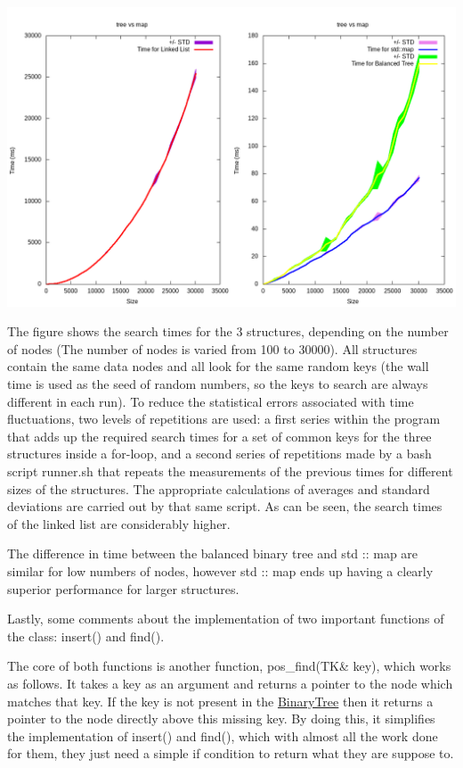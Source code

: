  
\begin{DoxyImage}
\includegraphics[width=\textwidth,height=\textheight/2,keepaspectratio=true]{benchmark.png}
\end{DoxyImage}
  

The figure shows the search times for the 3 structures, depending on the number of nodes (The number of nodes is varied from 100 to 30000). All structures contain the same data nodes and all look for the same random keys (the wall time is used as the seed of random numbers, so the keys to search are always different in each run). To reduce the statistical errors associated with time fluctuations, two levels of repetitions are used\+: a first series within the program that adds up the required search times for a set of common keys for the three structures inside a for-\/loop, and a second series of repetitions made by a bash script {\ttfamily runner.\+sh} that repeats the measurements of the previous times for different sizes of the structures. The appropriate calculations of averages and standard deviations are carried out by that same script. As can be seen, the search times of the linked list are considerably higher.

The difference in time between the balanced binary tree and std \+:: map are similar for low numbers of nodes, however std \+:: map ends up having a clearly superior performance for larger structures.

Lastly, some comments about the implementation of two important functions of the class\+: {\ttfamily insert()} and {\ttfamily find()}.

The core of both functions is another function, {\ttfamily pos\+\_\+find(\+T\+K\& key)}, which works as follows. It takes a key as an argument and returns a pointer to the node which matches that key. If the key is not present in the {\ttfamily \mbox{\hyperlink{classBinaryTree}{Binary\+Tree}}} then it returns a pointer to the node directly above this missing key. By doing this, it simplifies the implementation of {\ttfamily insert()} and {\ttfamily find()}, which with almost all the work done for them, they just need a simple if condition to return what they are suppose to.

